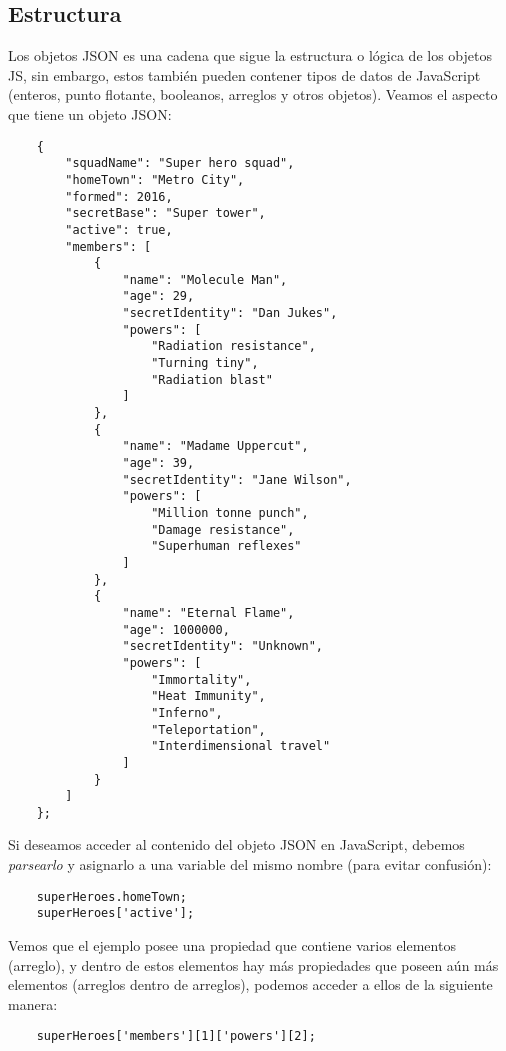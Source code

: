 \subsection{Estructura}
\hspace{0.55cm}Los objetos JSON es una cadena que sigue la estructura o lógica de los objetos JS, sin embargo, estos también pueden contener tipos de datos de JavaScript (enteros, punto flotante, booleanos, arreglos y otros objetos). Veamos el aspecto que tiene un objeto JSON:
\begin{lstlisting}
    {
        "squadName": "Super hero squad",
        "homeTown": "Metro City",
        "formed": 2016,
        "secretBase": "Super tower",
        "active": true,
        "members": [
            {
                "name": "Molecule Man",
                "age": 29,
                "secretIdentity": "Dan Jukes",
                "powers": [
                    "Radiation resistance",
                    "Turning tiny",
                    "Radiation blast"
                ]
            },
            {
                "name": "Madame Uppercut",
                "age": 39,
                "secretIdentity": "Jane Wilson",
                "powers": [
                    "Million tonne punch",
                    "Damage resistance",
                    "Superhuman reflexes"
                ]
            },
            {
                "name": "Eternal Flame",
                "age": 1000000,
                "secretIdentity": "Unknown",
                "powers": [
                    "Immortality",
                    "Heat Immunity",
                    "Inferno",
                    "Teleportation",
                    "Interdimensional travel"
                ]
            }
        ]
    };
\end{lstlisting}

Si deseamos acceder al contenido del objeto JSON en JavaScript, debemos \textit{parsearlo} y asignarlo a una variable del mismo nombre (para evitar confusión):
\begin{lstlisting}
    superHeroes.homeTown;
    superHeroes['active'];
\end{lstlisting}

Vemos que el ejemplo posee una propiedad que contiene varios elementos (arreglo), y dentro de estos elementos hay más propiedades que poseen aún más elementos (arreglos dentro de arreglos), podemos acceder a ellos de la siguiente manera:
\begin{lstlisting}
    superHeroes['members'][1]['powers'][2];
\end{lstlisting}



